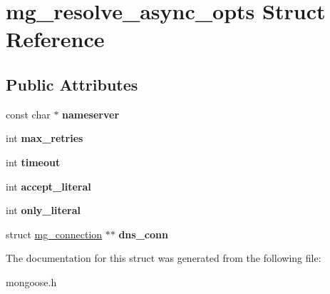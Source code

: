 \hypertarget{structmg__resolve__async__opts}{}\section{mg\+\_\+resolve\+\_\+async\+\_\+opts Struct Reference}
\label{structmg__resolve__async__opts}
\subsection*{Public Attributes}
\begin{DoxyCompactItemize}
\item 
\mbox{\label{structmg__resolve__async__opts_a2fb7183d887260a2b3576e47641e96dc}} 
const char $\ast$ {\bfseries nameserver}
\item 
\mbox{\label{structmg__resolve__async__opts_a6db0305ac9736d2f98507ce07bebcd59}} 
int {\bfseries max\+\_\+retries}
\item 
\mbox{\label{structmg__resolve__async__opts_adeb3e0102e6e1eb86340e86fcc2b3560}} 
int {\bfseries timeout}
\item 
\mbox{\label{structmg__resolve__async__opts_a9e7955b13fd4cac697a92ca28dff30ae}} 
int {\bfseries accept\+\_\+literal}
\item 
\mbox{\label{structmg__resolve__async__opts_ae7bb70da865548e33663e1292e334293}} 
int {\bfseries only\+\_\+literal}
\item 
\mbox{\label{structmg__resolve__async__opts_ac82e8d612fe2f822fc99ca3bd2d9921c}} 
struct \hyperlink{structmg__connection}{mg\+\_\+connection} $\ast$$\ast$ {\bfseries dns\+\_\+conn}
\end{DoxyCompactItemize}


The documentation for this struct was generated from the following file\+:\begin{DoxyCompactItemize}
\item 
mongoose.\+h\end{DoxyCompactItemize}
